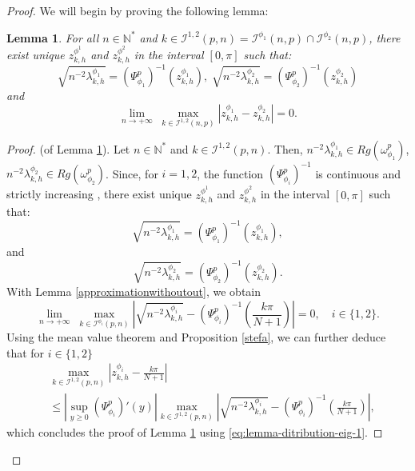 \documentclass[11pt]{article}
\newtheorem{lemma}{Lemma}[section]
\begin{document}
\begin{proof}
We will begin by proving the following lemma:
\begin{lemma}\label{theo:lemma-ditribution-eig-1}
For all $n \in \mathbb{N}^*$ and $k \in \mathcal{I}^{1,2}(p,n)=\mathcal{I}^{\phi_1}(n,p)\cap\mathcal{I}^{\phi_2}(n,p)$, there exist unique $z_{k,h}^{\phi^1}$ and $z_{k,h}^{\phi^2}$ in the interval $[0, \pi]$ such that:
$$\sqrt{n^{-2}\lambda_{k,h}^{\phi_1}}= \left(\Psi^{p}_{\phi_1}\right)^{-1}(z_{k,h}^{\phi_1}),\; \sqrt{n^{-2}\lambda_{k,h}^{\phi_2}}= \left(\Psi^{p}_{\phi_2}\right)^{-1}(z_{k,h}^{\phi_2})$$
and 
$$
\lim_{n\rightarrow +\infty}\; \max_{k \in \mathcal{I}^{1,2}(n,p)} \left| z_{k,h}^{\phi_1}-   z_{k,h}^{\phi_2}  \right|=0.
$$
\end{lemma}

\begin{proof} (of Lemma \ref{theo:lemma-ditribution-eig-1}).
Let $n \in \mathbb{N}^*$ and $k \in \mathcal{I}^{1,2}(p,n)$. Then, $n^{-2}\lambda_{k,h}^{\phi_1} \in Rg (\omega_{\phi_1}^p )$, $n^{-2}\lambda_{k,h}^{\phi_2} \in Rg (\omega_{\phi_2}^p )$. Since, for $i=1,2$, the function $\left(\Psi^{p}_{\phi_i}\right)^{-1}$ is continuous and strictly increasing , there exist unique $z_{k,h}^{\phi^1}$ and $z_{k,h}^{\phi^2}$ in the interval $[0, \pi]$ such that:
$$
\sqrt{n^{-2}\lambda_{k,h}^{\phi_1}}= \left(\Psi^{p}_{\phi_1}\right)^{-1}(z_{k,h}^{\phi_1}),
$$
and 
$$
\sqrt{n^{-2}\lambda_{k,h}^{\phi_2}}= \left(\Psi^{p}_{\phi_2}\right)^{-1}(z_{k,h}^{\phi_2}).
$$
With Lemma \ref{approximationwithoutout}, we obtain
\begin{equation}\label{eq:lemma-ditribution-eig-1}
\lim_{n \rightarrow +\infty}\;\max_{k \in \mathcal{I}^{\phi_i}(p,n)}\left|    \sqrt{n^{-2}\lambda_{k,h}^{\phi_i}}   -  \left(\Psi^{p}_{\phi_i}\right)^{-1}\left(\frac{k\pi}{N+1}\right)\right|= 0,\quad i \in \{1,2 \}.
\end{equation}
Using the mean value theorem and Proposition \ref{stefa}, we can further deduce that for $ i \in \{1,2 \}$
\begin{align*}
&\max_{k \in\mathcal{I}^{1,2}(p,n)}\left|  z_{k,h}^{\phi_i} -\frac{k\pi}{N+1} \right |\\
&\leq \left| \sup_{y \geq 0} \left(\Psi^{p}_{\phi_i}\right)'(y)\right| \max_{k \in \mathcal{I}^{1,2}(p,n)}\left|  \sqrt{n^{-2}\lambda_{k,h}^{\phi_i}}   -  \left(\Psi^{p}_{\phi_i}\right)^{-1}\left(\frac{k\pi}{N+1}\right) \right |,
\end{align*}
which concludes the proof of Lemma \ref{theo:lemma-ditribution-eig-1} using \eqref{eq:lemma-ditribution-eig-1}.

\end{proof}
\end{proof}
\end{document}
